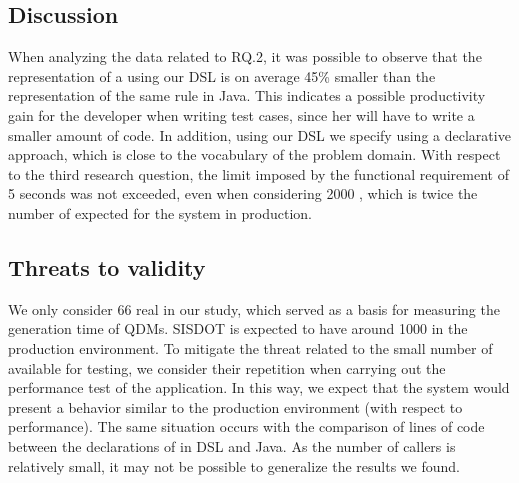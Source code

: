 \subsection{Discussion}

When analyzing the data related to RQ.2, it was possible to observe that the representation 
of a \shc using our DSL is on average 45\% smaller than the representation of the same rule in Java. 
This indicates a possible productivity gain for the developer when writing test cases, 
since her will have to write a smaller amount of code. In addition, using our DSL we 
specify \callers using a declarative approach, which is close to the vocabulary of 
the problem domain. 
With respect to the third research question, the limit imposed by the functional requirement of 5 seconds was not exceeded,  
even when considering 2000 \callers, which is twice the number of \callers expected for the system 
in production.

\subsection{Threats to validity}


We only consider 66 real \callers in our study, which served as a basis for measuring the generation time 
of QDMs. SISDOT is expected to have around 1000 \callers in the production environment. To mitigate the threat 
related to the small number of available \callers for testing, we consider their repetition when carrying out the 
performance test of the application. In this way, we expect that the system would present a behavior similar 
to the production environment (with respect to performance). The same situation occurs with the comparison 
of lines of code between the declarations of \callers in DSL and Java. As the number of callers is relatively small, 
it may not be possible to generalize the results we found.
